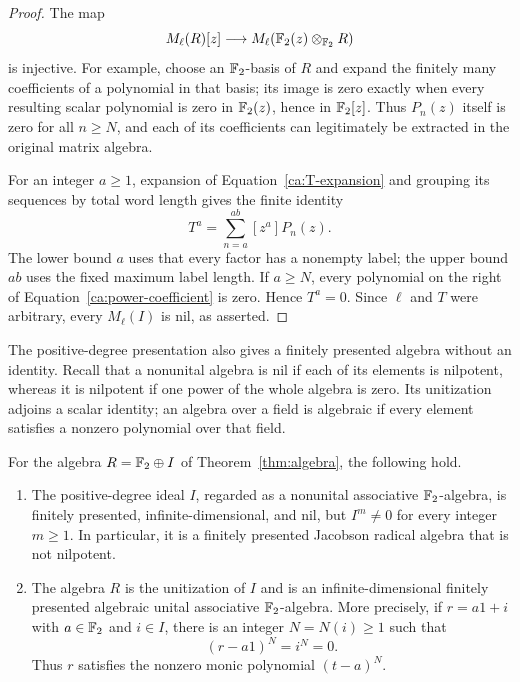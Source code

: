 \begin{proof}
The map
\[
  M_\ell(R)[z]\longrightarrow M_\ell(\mathbb F_2(z)\otimes_{\mathbb F_2}R)
\]
is injective.  For example, choose an $\mathbb F_2$-basis of $R$ and expand the
finitely many coefficients of a polynomial in that basis; its image is
zero exactly when every resulting scalar polynomial is zero in
$\mathbb F_2(z)$, hence in $\mathbb F_2[z]$.  Thus $P_n(z)$ itself is zero for all
$n\geq N$, and each of its coefficients can legitimately be extracted
in the original matrix algebra.

For an integer $a\geq1$, expansion of Equation~\eqref{ca:T-expansion}
and grouping its sequences by total word length gives the finite identity
\begin{equation}
  T^a=\sum_{n=a}^{ab}[z^a]P_n(z).
  \label{ca:power-coefficient}
\end{equation}
The lower bound $a$ uses that every factor has a nonempty label; the
upper bound $ab$ uses the fixed maximum label length.  If $a\geq N$,
every polynomial on the right of Equation~\eqref{ca:power-coefficient}
is zero.  Hence $T^a=0$.  Since $\ell$ and $T$ were arbitrary, every
$M_\ell(I)$ is nil, as asserted.
\end{proof}

The positive-degree presentation also gives a finitely presented algebra
without an identity. Recall that a nonunital algebra is nil if each of its
elements is nilpotent, whereas it is nilpotent if one power of the whole
algebra is zero. Its unitization adjoins a scalar identity; an algebra over
a field is algebraic if every element satisfies a nonzero polynomial over
that field.

\begin{corollary}
\label{cor:nil-algebra}
For the algebra $R=\mathbb F_2\oplus I$ of Theorem~\ref{thm:algebra}, the
following hold.
\begin{enumerate}
\item The positive-degree ideal $I$, regarded as a nonunital associative
$\mathbb F_2$-algebra, is finitely presented, infinite-dimensional, and nil, but
$I^m\ne0$ for every integer $m\geq1$. In particular, it is a finitely
presented Jacobson radical algebra that is not nilpotent.
\item The algebra $R$ is the unitization of $I$ and is an
infinite-dimensional finitely presented algebraic unital associative
$\mathbb F_2$-algebra. More precisely, if $r=a1+i$ with $a\in\mathbb F_2$ and $i\in I$,
there is an integer $N=N(i)\geq1$ such that
\[
 (r-a1)^N=i^N=0.
\]
Thus $r$ satisfies the nonzero monic polynomial $(t-a)^N$.
\end{enumerate}
\end{corollary}

